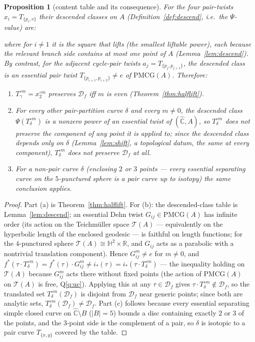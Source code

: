 \documentclass[11pt]{article}
\newtheorem{proposition}[theorem]{Proposition}
\theoremstyle{definition}
\theoremstyle{remark}
\newcommand{\Teich}{\mathcal T}
\newcommand{\PMCG}{\mathrm{PMCG}}
\newcommand{\Chat}{\widehat{\mathbb C}}
\newcommand{\Df}{\mathcal D_f}
\begin{document}
\begin{proposition}[content table and its consequence]\label{prop:contenttable}
For the four pair-twists $x_i=T_{\{p_i,v\}}$ their descended
classes on $A$ \textup{(}Definition~\ref{def:descend}, i.e.\ the
$\Psi$-value\textup{)} are:

where for $i\neq1$ it is the \emph{square} that lifts (the smallest
liftable power), each because the relevant branch side contains at most
one point of $A$ \textup{(}Lemma~\ref{lem:descend}\textup{)}.  By
contrast, for the adjacent cycle-pair twists $a_j=T_{\{p_j,p_{j+1}\}}$,
the descended class is an essential pair twist
$T_{\{p_{i+1},p_{i+2}\}}\neq e$ of $\PMCG(A)$.  Therefore:
\begin{enumerate}[label=\textup{(}\alph*\textup{)}]
\item $T_\gamma^{\circ m}=x_2^{\circ m}$ preserves $\Df$ iff $m$ is
even \textup{(}Theorem~\ref{thm:halflift}\textup{)}.
\item For every other pair-partition curve $\delta$ and every
$m\neq0$, the descended class $\Psi(T_\delta^{\circ m})$ is a nonzero
power of an essential twist of $(\Chat,A)$, so
$T_\delta^{\circ m}$ does not preserve the component of any point it
is applied to; since the descended class depends only on
$\delta$ \textup{(}Lemma~\ref{lem:shift}, a topological datum, the same
at every component\textup{)}, $T_\delta^{\circ m}$ does not preserve
$\Df$ at all.
\item For a non-pair curve $\delta$ \textup{(}enclosing $2$ or $3$
points — every essential separating curve on the $5$-punctured sphere
is a pair curve up to isotopy\textup{)} the same conclusion applies.
\end{enumerate}
\end{proposition}

\begin{proof}
Part (a) is Theorem~\ref{thm:halflift}.  For (b): the descended-class
table is Lemma~\ref{lem:descend}; an essential Dehn twist
$G_{ij}\in\PMCG(A)$ has infinite order (its action on the Teichm\"uller
space $\Teich(A)$ — equivalently on the hyperbolic length of the
enclosed geodesic — is faithful on length functions; for the
$4$-punctured sphere $\Teich(A)\cong\mathbb H^2\times\mathbb R$, and
$G_{ij}$ acts as a parabolic with a nontrivial translation component).
Hence $G_{ij}^m\ne e$ for $m\ne0$, and
$f^*(\tau\cdot T_\delta^{\circ m})
=f^*(\tau)\cdot G_{ij}^{m}\neq i_*(\tau)=i_*(\tau\cdot T_\delta^{\circ m})$
— the inequality holding on $\Teich(A)$ because $G_{ij}^m$ acts there
without fixed points (the action of $\PMCG(A)$ on $\Teich(A)$ is free,
Q\ref{q:uc}).  Applying this at any $\tau\in\Df$ gives
$\tau\cdot T_\delta^{\circ m}\notin\Df$, so the translated set
$T_\delta^{\circ m}(\Df)$ is disjoint from $\Df$ near generic points;
since both are analytic sets, $T_\delta^{\circ m}(\Df)\ne\Df$.
Part (c) follows because every essential separating simple closed curve
on $\Chat\setminus B$ ($|B|=5$) bounds a disc containing exactly $2$ or
$3$ of the points, and the $3$-point side is the complement of a pair,
so $\delta$ is isotopic to a pair curve $T_{\{x,y\}}$ covered by the
table.
\end{proof}
\end{document}
